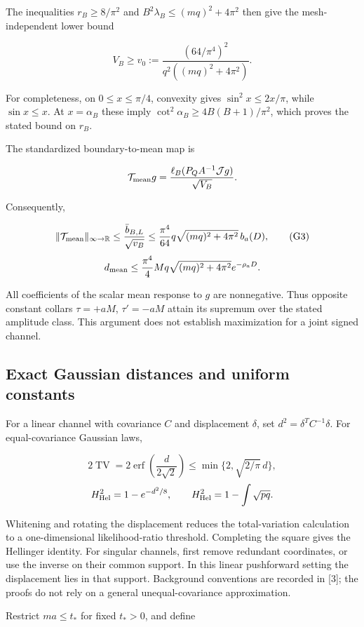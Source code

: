 \documentclass[
  11pt,
  letterpaper,
]{article}
\begin{document}
The inequalities \(r_B\ge8/\pi^2\) and \(B^2\lambda_B\le(mq)^2+4\pi^2\)
then give the mesh-independent lower bound

\[
V_B\ge v_0:=\frac{(64/\pi^4)^2}
{q^2((mq)^2+4\pi^2)}.
\tag{G2}
\]

For completeness, on \(0\le x\le\pi/4\), convexity gives
\(\sin^2x\le2x/\pi\), while \(\sin x\le x\). At \(x=\alpha_B\) these
imply \(\cot^2\alpha_B\ge4B(B+1)/\pi^2\), which proves the stated bound
on \(r_B\).

The standardized boundary-to-mean map is

\[
\mathcal T_{\rm mean}g=
\frac{\ell_B(P_QA^{-1}\mathcal Jg)}{\sqrt{V_B}}.
\]

Consequently,

\[
\|\mathcal T_{\rm mean}\|_{\infty\to\mathbb R}
\le\frac{\bar b_{B,L}}{\sqrt{v_B}}
\le\frac{\pi^4}{64}q\sqrt{(mq)^2+4\pi^2}\,b_a(D),
\tag{G3}
\] \[
d_{\rm mean}\le
\frac{\pi^4}{4}Mq\sqrt{(mq)^2+4\pi^2}e^{-\rho_aD}.
\]

All coefficients of the scalar mean response to \(g\) are nonnegative.
Thus opposite constant collars \(\tau=+aM\), \(\tau'=-aM\) attain its
supremum over the stated amplitude class. This argument does not
establish maximization for a joint signed channel.

\subsection{Exact Gaussian distances and uniform
constants}\label{exact-gaussian-distances-and-uniform-constants}

For a linear channel with covariance \(C\) and displacement \(\delta\),
set \(d^2=\delta^TC^{-1}\delta\). For equal-covariance Gaussian laws,

\[
2\operatorname{TV}=2\operatorname{erf}\left(\frac{d}{2\sqrt2}\right)
\le\min\{2,\sqrt{2/\pi}\,d\},
\] \[
H_{\rm Hel}^2=1-e^{-d^2/8},\qquad
H_{\rm Hel}^2=1-\int\sqrt{pq}.
\]

Whitening and rotating the displacement reduces the total-variation
calculation to a one-dimensional likelihood-ratio threshold. Completing
the square gives the Hellinger identity. For singular channels, first
remove redundant coordinates, or use the inverse on their common
support. In this linear pushforward setting the displacement lies in
that support. Background conventions are recorded in {[}3{]}; the proofs
do not rely on a general unequal-covariance approximation.

Restrict \(ma\le t_*\) for fixed \(t_*>0\), and define
\end{document}
